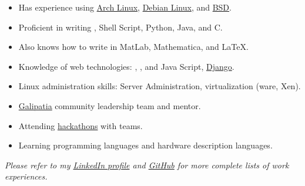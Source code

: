 \documentclass[10pt,a4paper]{article}
\begin{document}
  {
  \begin{itemize}
    \item Has experience using \href{https://www.archlinux.org/}{Arch Linux}, 
    \href{https://www.debian.org/}{Debian Linux}, and \href{http://www.bsd.org/}{BSD}. 
    \item Proficient in writing \CPP, Shell Script, Python, Java, and C.
    \item Also knows how to write in MatLab, Mathematica, and LaTeX\nsp.
    \item Knowledge of web technologies: , , and Java Script, \href{https://www.djangoproject.com/}{Django}.
    \item Linux administration skills: Server Administration, virtualization (ware, Xen).
  \end{itemize}}
  {
  \begin{itemize}
    \item \href{https://www.inventscommunity.org/}{Galipatia} community leadership team and mentor.
    \item Attending \href{https://mlh.io/}{hackathons} with teams.
    \item Learning programming languages and hardware description languages.
  \end{itemize}}
\spacedhrule{1 em}{1 em}

\begin{center}
  \emph{\small Please refer to my \href{https://www.linkedin.com/in/aaron-v-brown-ba3684101/}{LinkedIn profile} and \href{https://github.com/DaBrownDev}{GitHub} for more complete lists of work experiences.}
\end{center}
\spacedhrule{1 em}{1 em}
\end{document}

